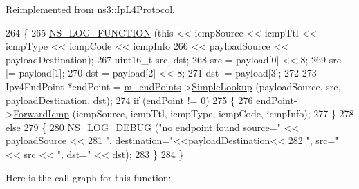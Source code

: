 Reimplemented from \hyperlink{classns3_1_1IpL4Protocol_a4859731c656d5309c07d2d47bacd4121}{ns3\+::\+Ip\+L4\+Protocol}.


\begin{DoxyCode}
264 \{
265   \hyperlink{log-macros-disabled_8h_a90b90d5bad1f39cb1b64923ea94c0761}{NS\_LOG\_FUNCTION} (\textcolor{keyword}{this} << icmpSource << icmpTtl << icmpType << icmpCode << icmpInfo 
266                         << payloadSource << payloadDestination);
267   uint16\_t src, dst;
268   src = payload[0] << 8;
269   src |= payload[1];
270   dst = payload[2] << 8;
271   dst |= payload[3];
272 
273   Ipv4EndPoint *endPoint = \hyperlink{classns3_1_1UdpL4Protocol_a3bde93d3afb318d7e0b4a7b3d3a58e7c}{m\_endPoints}->\hyperlink{classns3_1_1Ipv4EndPointDemux_a524bb724e8bbd40648172938758860ec}{SimpleLookup} (payloadSource, src, 
      payloadDestination, dst);
274   \textcolor{keywordflow}{if} (endPoint != 0)
275     \{
276       endPoint->\hyperlink{classns3_1_1Ipv4EndPoint_a53cc03159a64a6aa2eed49382dc42381}{ForwardIcmp} (icmpSource, icmpTtl, icmpType, icmpCode, icmpInfo);
277     \}
278   \textcolor{keywordflow}{else}
279     \{
280       \hyperlink{group__logging_ga413f1886406d49f59a6a0a89b77b4d0a}{NS\_LOG\_DEBUG} (\textcolor{stringliteral}{"no endpoint found source="} << payloadSource <<
281                     \textcolor{stringliteral}{", destination="}<<payloadDestination<<
282                     \textcolor{stringliteral}{", src="} << src << \textcolor{stringliteral}{", dst="} << dst);
283     \}
284 \}
\end{DoxyCode}


Here is the call graph for this function\+:


